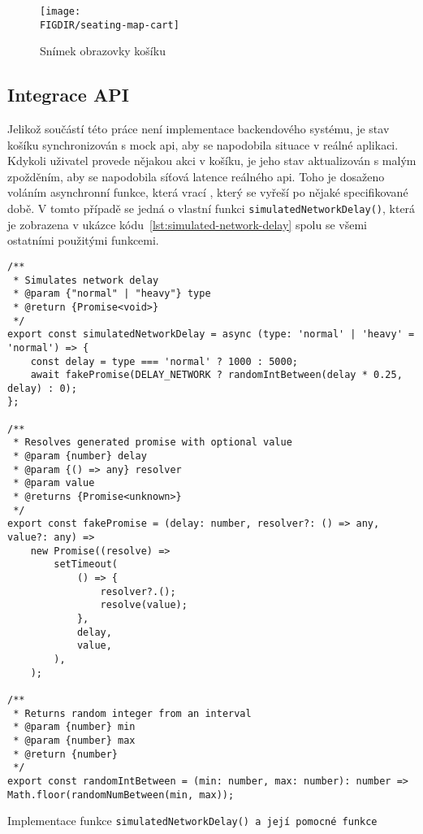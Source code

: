 \begin{figure}[h]
	\centering
	\texttt{[image: \\FIGDIR/seating-map-cart]}
	\caption{Snímek obrazovky košíku}
	\label{fig:seating-map-cart}
\end{figure}

\subsection{Integrace API}
\label{subsec:implementace-kosik-api}
Jelikož součástí této práce není implementace backendového systému, je stav košíku synchronizován s mock \ac{api}, aby se napodobila situace v reálné aplikaci.
Kdykoli uživatel provede nějakou akci v košíku, je jeho stav aktualizován s malým zpožděním, aby se napodobila síťová latence reálného \ac{api}.
Toho je dosaženo voláním asynchronní funkce, která vrací , který se vyřeší po nějaké specifikované době.
V tomto případě se jedná o vlastní funkci \texttt{simulatedNetworkDelay()}, která je zobrazena v ukázce kódu~\ref{lst:simulated-network-delay} spolu se všemi ostatními použitými funkcemi.

\begin{listing}[H]
\begin{verbatim}
/**
 * Simulates network delay
 * @param {"normal" | "heavy"} type
 * @return {Promise<void>}
 */
export const simulatedNetworkDelay = async (type: 'normal' | 'heavy' = 'normal') => {
	const delay = type === 'normal' ? 1000 : 5000;
	await fakePromise(DELAY_NETWORK ? randomIntBetween(delay * 0.25, delay) : 0);
};

/**
 * Resolves generated promise with optional value
 * @param {number} delay
 * @param {() => any} resolver
 * @param value
 * @returns {Promise<unknown>}
 */
export const fakePromise = (delay: number, resolver?: () => any, value?: any) =>
	new Promise((resolve) =>
		setTimeout(
			() => {
				resolver?.();
				resolve(value);
			},
			delay,
			value,
		),
	);

/**
 * Returns random integer from an interval
 * @param {number} min
 * @param {number} max
 * @return {number}
 */
export const randomIntBetween = (min: number, max: number): number => Math.floor(randomNumBetween(min, max));
\end{verbatim}
\caption{Implementace funkce \texttt{simulatedNetworkDelay() a její pomocné funkce}}
\label{lst:simulated-network-delay}
\end{listing}


